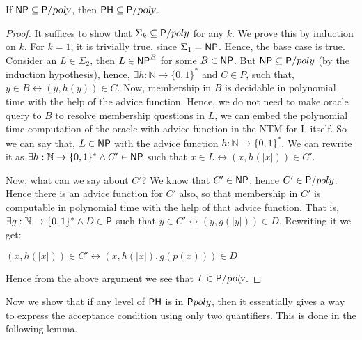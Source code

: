 \documentclass[11pt]{article}
\begin{document}
\begin{lemma}
 If $\NP \subseteq \P/\poly$, then $\PH \subseteq \P/\poly$.
\end{lemma}
\begin{proof}
It suffices to show that $\Sigma_{k} \subseteq \P/poly$ for any $k$. We prove this by induction on $k$.
For $k = 1$, it is trivially true, since $\Sigma_{1} = \NP$. Hence, the base case is true. Consider
an $L \in \Sigma_{2}$, then $L \in \NP^{B}$ for some $B \in \NP$. But $\NP \subseteq \P/poly$ (by
the induction hypothesis), hence, $\exists h : \mathbb{N} \rightarrow \{0, 1\}^*$ and $C \in P$,
such that, $y \in B \leftrightarrow  (y, h(y)) \in C$. Now, membership in $B$ is decidable in
polynomial time with the help of the advice function. Hence, we do not need to make oracle query to
$B$ to resolve membership questions in $L$, we can embed the polynomial time computation of the
oracle with advice function in the NTM for L itself. So we can say that, $L \in \NP$ with the advice
function $h : \mathbb{N} \rightarrow \{0, 1\}^*$. We can rewrite it as $\exists h : \mathbb{N}
\rightarrow \{0, 1\}^* \wedge C' \in \NP$ such that  $x \in L \leftrightarrow (x, h(|x|)) \in C'$.

Now, what can we say about $C'$? We know that $C' \in \NP$, hence $C' \in \P/poly$. Hence there is
an advice function for $C'$ also, so that membership in $C'$ is computable in polynomial time with
the help of that advice function. That is, $\exists g : \mathbb{N} \rightarrow \{0, 1\}^* \wedge D
\in \P$ such that  $y \in C' \leftrightarrow (y, g(|y|)) \in D$. Rewriting it we get:

\begin{center}
\begin{math}
 (x, h(|x|)) \in C' \leftrightarrow (x, h(|x|), g(p(x))) \in D
\end{math}
\end{center}

Hence from the above argument we see that $L \in \P/\poly$.
\end{proof}

Now we show that if any level of $\PH$ is in $\P\/poly$, then it essentially gives a way to express the acceptance condition using only two quantifiers. This is done in the following lemma.
\end{document}
